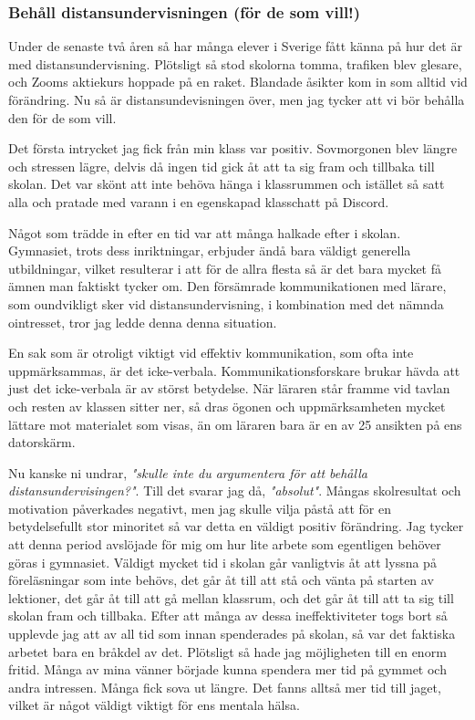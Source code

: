 \subsubsection{Behåll distansundervisningen (för de som vill!)}

Under de senaste två åren så har många elever i Sverige fått känna på hur det är med distansundervisning. Plötsligt så stod skolorna tomma, trafiken blev glesare, och Zooms aktiekurs hoppade på en raket. Blandade åsikter kom in som alltid vid förändring. Nu så är distansundevisningen över, men jag tycker att vi bör behålla den för de som vill.

Det första intrycket jag fick från min klass var positiv. Sovmorgonen blev längre och stressen lägre, delvis då ingen tid gick åt att ta sig fram och tillbaka till skolan. Det var skönt att inte behöva hänga i klassrummen och istället så satt alla och pratade med varann i en egenskapad klasschatt på Discord.

Något som trädde in efter en tid var att många halkade efter i skolan. Gymnasiet, trots dess inriktningar, erbjuder ändå bara väldigt generella utbildningar, vilket resulterar i att för de allra flesta så är det bara mycket få ämnen man faktiskt tycker om. Den försämrade kommunikationen med lärare, som oundvikligt sker vid distansundervisning, i kombination med det nämnda ointresset, tror jag ledde denna denna situation.

En sak som är otroligt viktigt vid effektiv kommunikation, som ofta inte uppmärksammas, är det icke-verbala. Kommunikationsforskare brukar hävda att just det icke-verbala är av störst betydelse. När läraren står framme vid tavlan och resten av klassen sitter ner, så dras ögonen och uppmärksamheten mycket lättare mot materialet som visas, än om läraren bara är en av 25 ansikten på ens datorskärm.

Nu kanske ni undrar, \textit{"skulle inte du argumentera för att behålla distansundervisingen?"}. Till det svarar jag då, \textit{"absolut"}. Mångas skolresultat och motivation påverkades negativt, men jag skulle vilja påstå att för en betydelsefullt stor minoritet så var detta en väldigt positiv förändring. Jag tycker att denna period avslöjade för mig om hur lite arbete som egentligen behöver göras i gymnasiet. Väldigt mycket tid i skolan går vanligtvis åt att lyssna på föreläsningar som inte behövs, det går åt till att stå och vänta på starten av lektioner, det går åt till att gå mellan klassrum, och det går åt till att ta sig till skolan fram och tillbaka. Efter att många av dessa ineffektiviteter togs bort så upplevde jag att av all tid som innan spenderades på skolan, så var det faktiska arbetet bara en bråkdel av det. Plötsligt så hade jag möjligheten till en enorm fritid. Många av mina vänner började kunna spendera mer tid på gymmet och andra intressen. Många fick sova ut längre. Det fanns alltså mer tid till jaget, vilket är något väldigt viktigt för ens mentala hälsa.

